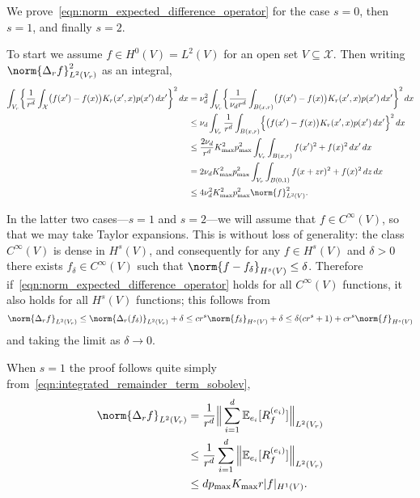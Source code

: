 \documentclass{article}
\newcommand{\1}{\mathbf{1}}
\newcommand{\Xset}{\mathcal{X}}
\newcommand{\Leb}{L}
\newcommand{\Ebb}{\mathbb{E}}
\theoremstyle{alden}
\theoremstyle{aldenthm}
\theoremstyle{definition}
\theoremstyle{remark}
\begin{document}
We prove~\eqref{eqn:norm_expected_difference_operator} for the case $s = 0$, then $s = 1$, and finally $s = 2$.

To start we assume $f \in H^0(V) = \Leb^2(V)$ for an open set $V \subseteq \Xset$. Then writing $\norm{\Delta_rf}_{\Leb^2(V_r)}^2$ as an integral,  
\begin{align*}
\int_{V_r} \biggl\{\frac{1}{r^d} \int_{\Xset} \bigl(f(x') - f(x)\bigr) K_r(x',x) p(x') \,dx'\biggr\}^2 \,dx & = \nu_d^2 \int_{V_r} \biggl\{\frac{1}{\nu_d r^d} \int_{B(x,r)} \bigl(f(x') - f(x)\bigr) K_r(x',x) p(x') \,dx'\biggr\}^2 \,dx \\
& \leq \nu_d \int_{V_r} \frac{1}{r^d} \int_{B(x,r)} \Bigl\{\bigl(f(x') - f(x)\bigr) K_r(x',x) p(x') \,dx'\Bigr\}^2 \,dx \\
& \leq \frac{2 \nu_d }{r^d} K_{\max}^2 p_{\max}^2 \int_{V_r} \int_{B(x,r)} f(x')^2 + f(x)^2 \,dx' \,dx \\
& = 2 \nu_d K_{\max}^2 p_{\max}^2 \int_{V_r} \int_{B(0,1)} f(x + zr)^2 + f(x)^2 \,dz \,dx \\
& \leq 4 \nu_d^2 K_{\max}^2 p_{\max}^2 \norm{f}_{\Leb^2(V)}^2.
\end{align*}

In the latter two cases---$s = 1$ and $s = 2$---we will assume that $f \in C^{\infty}(V)$, so that we may take Taylor expansions. This is without loss of generality: the class $C^{\infty}(V)$ is dense in $H^s(V)$, and consequently for any $f \in H^s(V)$ and $\delta > 0$ there exists $f_{\delta} \in C^{\infty}(V)$ such that $\norm{f - f_{\delta}}_{H^s(V)} \leq \delta$. Therefore if~\eqref{eqn:norm_expected_difference_operator} holds for all $C^{\infty}(V)$ functions, it also holds for all $H^s(V)$ functions; this follows from
\begin{equation*}
\norm{\Delta_rf}_{\Leb^2(V_r)} \leq \norm{\Delta_r(f_{\delta})}_{\Leb^2(V_r)} + \delta \leq cr^s \norm{f_{\delta}}_{H^s(V)} + \delta \leq \delta(cr^s + 1) + cr^s\norm{f}_{H^s(V)}
\end{equation*}
and taking the limit as $\delta \to 0$.

When $s = 1$ the proof follows quite simply from~\eqref{eqn:integrated_remainder_term_sobolev},
\begin{align*}
\norm{\Delta_rf}_{\Leb^2(V_r)} & = \frac{1}{r^d}\Big\|\sum_{i = 1}^d \Ebb_{e_i}[R_f^{(e_i)}]\Bigr\|_{\Leb^2(V_r)} \\
& \leq \frac{1}{r^d}\sum_{i = 1}^{d} \Big\| \Ebb_{e_i}[R_f^{(e_i)}]\Bigr\|_{\Leb^2(V_r)} \\
& \leq d p_{\max} K_{\max} r |f|_{H^1(V)}.
\end{align*}
\end{document}
